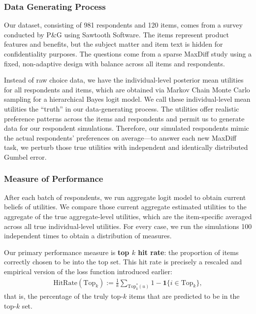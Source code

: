 \documentclass[nonblindrev]{informs3}
\newcommand{\topset}{\text{Top}_k}
\begin{document}
\subsubsection{Data Generating Process}

Our dataset, consisting of 981 respondents and 120 items, comes from a survey conducted by P\&G using Sawtooth Software. The items represent product features and benefits, but the subject matter and item text is hidden for confidentiality purposes. The questions come from a sparse MaxDiff study using a fixed, non-adaptive design with balance across all items and respondents. 

Instead of raw choice data, we have the individual-level posterior mean utilities for all respondents and items, which are obtained via Markov Chain Monte Carlo sampling for a hierarchical Bayes logit model. We call these individual-level mean utilities the ``truth'' in our data-generating process. The utilities offer realistic preference patterns across the items and respondents and permit us to generate data for our respondent simulations.  Therefore, our simulated respondents mimic the actual respondents' preferences on average---to answer each new MaxDiff task, we perturb those true utilities with independent and identically distributed Gumbel error. 

\subsubsection{Measure of Performance}

After each batch of respondents, we run aggregate logit model to obtain current beliefs of utilities. We compare those current aggregate estimated utilities to the aggregate of the true aggregate-level utilities, which are the item-specific averaged across all true individual-level utilities. For every case, we run the simulations 100 independent times to obtain a distribution of measures. 

Our primary performance measure is \textbf{top $k$ hit rate}: the proportion of items correctly chosen to be into the top set. 
This hit rate is precisely a rescaled and empirical version of the loss function introduced earlier:
\begin{align}
\text{HitRate}(\topset) := \frac{1}{k} \sum_{ \topset^{*}(u) }  1 - \mathbf{1}\{ i \in \topset \},
\end{align} 
that is, the percentage of the truly top-$k$ items that are predicted to be in the top-$k$ set.
\end{document}
